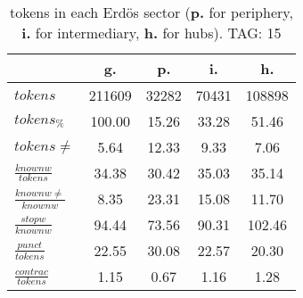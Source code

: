 \begin{table}[h!]
\begin{center}
\begin{tabular}{| l || c | c | c | c |}\hline
 & {\bf g.} & {\bf p.} & {\bf i.} & {\bf h.} \\\hline\hline
$tokens$ & 211609  & 32282  & 70431  & 108898 \\
$tokens_{\%}$ & 100.00  & 15.26  & 33.28  & 51.46 \\
$tokens \neq$ & 5.64  & 12.33  & 9.33  & 7.06 \\\hline
$\frac{knownw}{tokens}$ & 34.38  & 30.42  & 35.03  & 35.14 \\
$\frac{knownw \neq}{knownw}$ & 8.35  & 23.31  & 15.08  & 11.70 \\\hline
$\frac{stopw}{knownw}$ & 94.44  & 73.56  & 90.31  & 102.46 \\
$\frac{punct}{tokens}$ & 22.55  & 30.08  & 22.57  & 20.30 \\
$\frac{contrac}{tokens}$ & 1.15  & 0.67  & 1.16  & 1.28 \\\hline
\end{tabular}
\caption{tokens in each Erd\"os sector ({{\bf p.}} for periphery, {{\bf i.}} for intermediary, 
    {{\bf h.}} for hubs). TAG: 15}
\end{center}
\end{table}